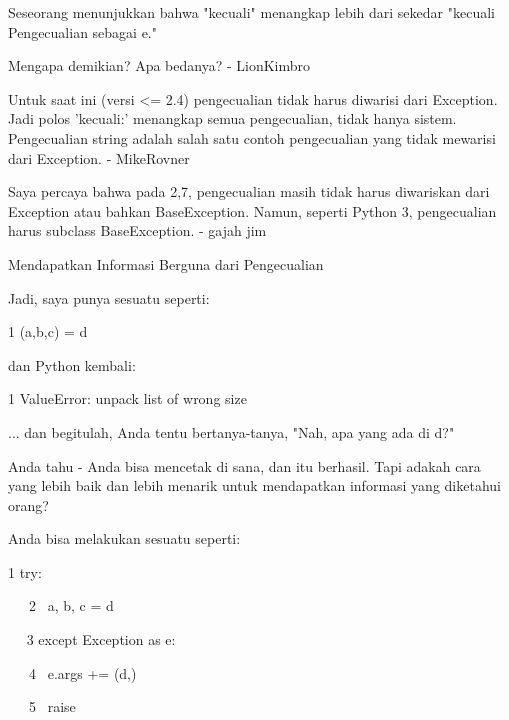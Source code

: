 \vspace{12pt}
Seseorang menunjukkan bahwa "kecuali" menangkap lebih dari sekedar "kecuali Pengecualian sebagai e." \par
\vspace{12pt}
Mengapa demikian? Apa bedanya? - LionKimbro \par
\vspace{12pt}
Untuk saat ini (versi <= 2.4) pengecualian tidak harus diwarisi dari Exception. Jadi polos 'kecuali:' menangkap semua pengecualian, tidak hanya sistem. Pengecualian string adalah salah satu contoh pengecualian yang tidak mewarisi dari Exception. - MikeRovner \par
\vspace{12pt}
Saya percaya bahwa pada 2,7, pengecualian masih tidak harus diwariskan dari Exception atau bahkan BaseException. Namun, seperti Python 3, pengecualian harus subclass BaseException. - gajah jim \par
\vspace{12pt}
Mendapatkan Informasi Berguna dari Pengecualian \par
\vspace{12pt}
Jadi, saya punya sesuatu seperti: \par
\vspace{12pt}
1 (a,b,c) = d \par
\vspace{12pt}
dan Python kembali: \par
\vspace{12pt}
1 ValueError: unpack list of wrong size \par
\vspace{12pt}
... dan begitulah, Anda tentu bertanya-tanya, "Nah, apa yang ada di d?" \par
\vspace{12pt}
Anda tahu - Anda bisa mencetak di sana, dan itu berhasil. Tapi adakah cara yang lebih baik dan lebih menarik untuk mendapatkan informasi yang diketahui orang? \par
\vspace{12pt}
Anda bisa melakukan sesuatu seperti: \par
\vspace{12pt}
1 try: \par
~~~2~  a, b, c = d \par
~~ 3 except Exception as e: \par
~~~4~  e.args += (d,) \par
~~~5~  raise \par
\vspace{12pt}
